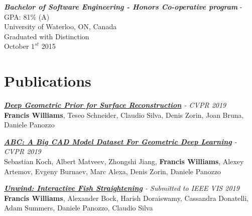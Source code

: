 \documentclass[line,10pt]{res}
\begin{document}
\begin{resume}
{\sl \textbf{Bachelor of Software Engineering - Honors Co-operative program}} - GPA: 81\% (A)\\ 
University of Waterloo, ON, Canada \\
Graduated with Distinction \\
October $1^{st}$ 2015






\vspace{0.2em}
\section{\Large \sc \textbf Publications}
\vspace{0.5em}

{\sl \textbf{\href{https://arxiv.org/abs/1811.10943}{Deep Geometric Prior for Surface Reconstruction}} - CVPR 2019}\\ 
\textbf{Francis Williams}, Teseo Schneider, Claudio Silva, Denis Zorin, Joan Bruna, Daniele Panozzo

{\sl \textbf{\href{https://arxiv.org/abs/1812.06216}{ABC: A Big CAD Model Dataset For Geometric Deep Learning}} - CVPR 2019}\\ 
Sebastian Koch, Albert Matveev, Zhongshi Jiang, \textbf{Francis Williams}, Alexey Artemov, Evgeny Burnaev, Marc Alexa, Denis Zorin, Daniele Panozzo

{\sl \textbf{\href{https://arxiv.org/abs/1904.04890}{Unwind: Interactive Fish Straightening}} - Submitted to IEEE VIS 2019}\\
\textbf{Francis Williams}, Alexander Bock, Harish Doraiswamy, Cassandra Donatelli, Adam Summers, Daniele Panozzo, Claudio Silva




\end{resume}
\end{document}
